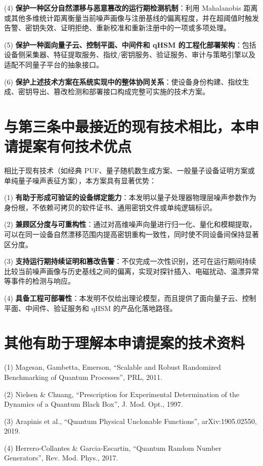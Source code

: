 \documentclass[12pt,a4paper]{article}
\begin{document}
(4) \textbf{保护一种区分自然漂移与恶意篡改的运行期检测机制}：利用 Mahalanobis 距离或其他多维统计距离衡量当前噪声画像与注册基线的偏离程度，并在超阈值时触发告警、密钥失效、证明拒绝、重新校准和重新注册中的一项或多项处理。

(5) \textbf{保护一种面向量子云、控制平面、中间件和 qHSM 的工程化部署架构}：包括设备侧采集器、特征提取服务、指纹/密钥服务、验证服务、审计与策略引擎以及适配不同量子平台的抽象接口。

(6) \textbf{保护上述技术方案在系统实现中的整体协同关系}：使设备身份构建、指纹生成、密钥导出、篡改检测和部署接口构成完整可实施的技术方案。

\section{与第三条中最接近的现有技术相比，本申请提案有何技术优点}

相比于现有技术（如经典 PUF、量子随机数生成方案、一般量子设备证明方案或单纯量子噪声表征方案），本方案具有显著优势：

(1) \textbf{有助于形成可验证的设备绑定能力}：本发明以量子处理器物理层噪声参数作为身份根，不依赖可拷贝的软件证书、通用密钥文件或单纯逻辑标识。

(2) \textbf{兼顾区分度与可重构性}：通过对高维噪声向量进行归一化、量化和模糊提取，可以在同一设备自然漂移范围内提高密钥重构一致性，同时使不同设备间保持显著区分度。

(3) \textbf{支持运行期持续证明和篡改告警}：不仅完成一次性识别，还可在运行期间持续比较当前噪声画像与历史基线之间的偏离，实现对探针插入、电磁扰动、温漂异常等事件的检测与响应。

(4) \textbf{具备工程可部署性}：本发明不仅给出理论模型，而且提供了面向量子云、控制平面、中间件、验证服务和 qHSM 的产品化落地路径。

\section{其他有助于理解本申请提案的技术资料}

(1) Magesan, Gambetta, Emerson, ``Scalable and Robust Randomized Benchmarking of Quantum Processes'', PRL, 2011.

(2) Nielsen \& Chuang, ``Prescription for Experimental Determination of the Dynamics of a Quantum Black Box'', J. Mod. Opt., 1997.

(3) Arapinis et al., ``Quantum Physical Unclonable Functions'', arXiv:1905.02550, 2019.

(4) Herrero-Collantes \& Garcia-Escartin, ``Quantum Random Number Generators'', Rev. Mod. Phys., 2017.
\end{document}
